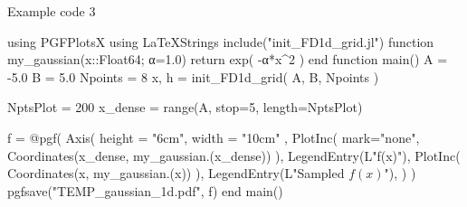 Example code 3

\begin{juliacode}
using PGFPlotsX
using LaTeXStrings
include("init_FD1d_grid.jl")
function my_gaussian(x::Float64; α=1.0)
  return exp( -α*x^2 )
end
function main()
  A = -5.0
  B =  5.0
  Npoints = 8
  x, h = init_FD1d_grid( A, B, Npoints )

  NptsPlot = 200
  x_dense = range(A, stop=5, length=NptsPlot)

  f = @pgf(
    Axis( {height = "6cm", width = "10cm" },
      PlotInc( {mark="none"}, Coordinates(x_dense, my_gaussian.(x_dense)) ),
      LegendEntry(L"f(x)"),
      PlotInc( Coordinates(x, my_gaussian.(x)) ),
      LegendEntry(L"Sampled $f(x)$"),
    )
  )
  pgfsave("TEMP_gaussian_1d.pdf", f)
end
main()
\end{juliacode}
